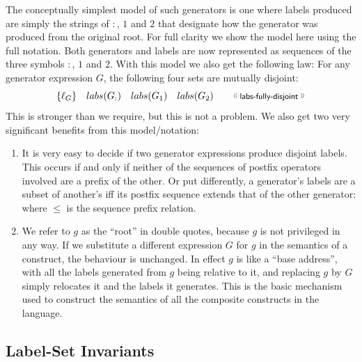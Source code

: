 The conceptually simplest model of such generators
is one where labels produced are simply the strings of $:$, $1$ and $2$
that designate how the generator was produced from the original root.
For full clarity we show the model here using the full notation.
Both generators and labels are now represented as sequences of the three symbols
$:$, $1$ and $2$.
With this model we also get the following law:
For any generator expression $G$,
the following four sets are mutually disjoint:
\[
  \setof{\ell_G}
  \quad
  labs(G_{:})
  \quad
  labs(G_1)
  \quad
  labs(G_2)
  \qquad
  \elabel{labs-fully-disjoint}
\]
This is stronger than we require, but this is not a problem.
We also get two very significant benefits from this model/notation:
\begin{enumerate}
  \item
    It is very easy to decide if two generator expressions produce
    disjoint labels.
    This occurs if and only if neither of the sequences of postfix operators
    involved are a prefix of the other.
    Or put differently, a generator's labels are a subset of another's
    iff its postfix sequence extends that of the other generator:
    where $\leq$ is the sequence prefix relation.
  \item
    We refer to $g$ as the ``root'' in double quotes,
    because $g$ is not privileged in any way.
    If we substitute a different expression $G$ for $g$
    in the semantics of a construct,
    the behaviour is unchanged.
    In effect $g$ is like a ``base address'',
    with all the labels generated from $g$ being relative to it,
    and replacing $g$ by $G$ simply relocates it and the labels it generates.
    This is the basic mechanism used to construct the semantics
    of all the composite constructs in the language.
\end{enumerate}


\subsection{Label-Set Invariants}

